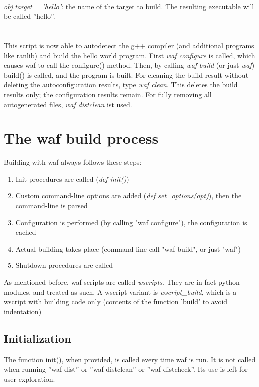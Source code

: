\documentclass[a4paper,10pt]{article}
\begin{document}
\\
\emph{obj.target = 'hello'}: the name of the target to build. The resulting executable will be called ''hello''.\\\\
\\
This script is now able to autodetect the g++ compiler (and additional programs like ranlib) and build the hello world program. First \emph{waf configure} is called, which causes waf to call the configure() method. Then, by calling \emph{waf build} (or just \emph{waf}) build() is called, and the program is built. For cleaning the build result without deleting the autoconfiguration results, type \emph{waf clean}. This deletes the build results only; the configuration results remain. For fully removing all autogenerated files, \emph{waf distclean} ist used.

\section{The waf build process}

Building with waf always follows these steps:

\begin{enumerate}
\item Init procedures are called (\emph{def init()})
\item Custom command-line options are added (\emph{def set\_options(opt)}), then the command-line is parsed
\item Configuration is performed (by calling "waf configure"), the configuration is cached
\item Actual building takes place (command-line call "waf build", or just "waf")
\item Shutdown procedures are called
\end{enumerate}

As mentioned before, waf scripts are called \emph{wscripts}. They are in fact python modules, and treated as such. A wscript variant is \emph{wscript\_build}, which is a wscript with building code only (contents of the function 'build' to avoid indentation)

\subsection{Initialization}
The function init(), when provided, is called every time waf is run. It is not called when running ''waf dist'' or ''waf distclean'' or ''waf distcheck''. Its use is left for user exploration.
\end{document}

